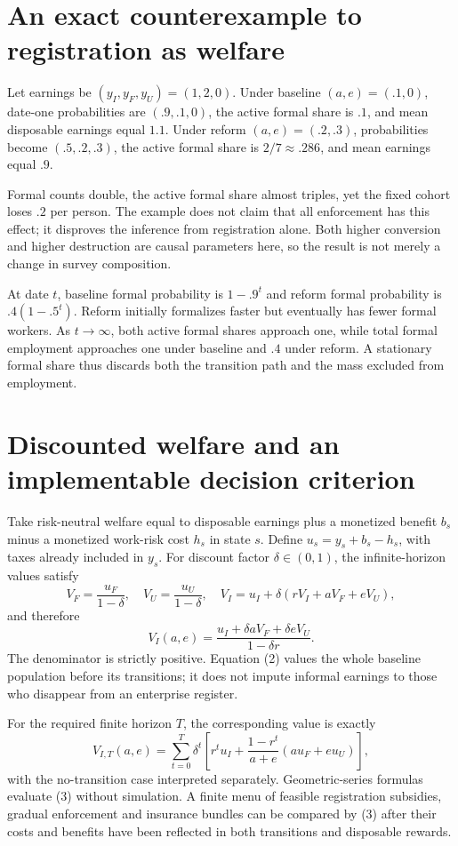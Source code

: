\documentclass[11pt]{article}
\begin{document}
\section*{An exact counterexample to registration as welfare}
Let earnings be $(y_I,y_F,y_U)=(1,2,0)$. Under baseline $(a,e)=(.1,0)$, date-one probabilities are $(.9,.1,0)$, the active formal share is $.1$, and mean disposable earnings equal $1.1$. Under reform $(a,e)=(.2,.3)$, probabilities become $(.5,.2,.3)$, the active formal share is $2/7\approx.286$, and mean earnings equal $.9$.

Formal counts double, the active formal share almost triples, yet the fixed cohort loses $.2$ per person. The example does not claim that all enforcement has this effect; it disproves the inference from registration alone. Both higher conversion and higher destruction are causal parameters here, so the result is not merely a change in survey composition.

At date $t$, baseline formal probability is $1-.9^t$ and reform formal probability is $.4(1-.5^t)$. Reform initially formalizes faster but eventually has fewer formal workers. As $t\to\infty$, both active formal shares approach one, while total formal employment approaches one under baseline and $.4$ under reform. A stationary formal share thus discards both the transition path and the mass excluded from employment.

\section*{Discounted welfare and an implementable decision criterion}
Take risk-neutral welfare equal to disposable earnings plus a monetized benefit $b_s$ minus a monetized work-risk cost $h_s$ in state $s$. Define $u_s=y_s+b_s-h_s$, with taxes already included in $y_s$. For discount factor $\delta\in(0,1)$, the infinite-horizon values satisfy
\[
 V_F=\frac{u_F}{1-\delta},\quad V_U=\frac{u_U}{1-\delta},\quad
 V_I=u_I+\delta(rV_I+aV_F+eV_U),
\]
and therefore
\[
 V_I(a,e)=\frac{u_I+\delta aV_F+\delta eV_U}{1-\delta r}. \tag{2}
\]
The denominator is strictly positive. Equation (2) values the whole baseline population before its transitions; it does not impute informal earnings to those who disappear from an enterprise register.

For the required finite horizon $T$, the corresponding value is exactly
\[
 V_{I,T}(a,e)=\sum_{t=0}^T\delta^t
 \left[r^tu_I+\frac{1-r^t}{a+e}(au_F+eu_U)\right],    \tag{3}
\]
with the no-transition case interpreted separately. Geometric-series formulas evaluate (3) without simulation. A finite menu of feasible registration subsidies, gradual enforcement and insurance bundles can be compared by (3) after their costs and benefits have been reflected in both transitions and disposable rewards.
\end{document}

